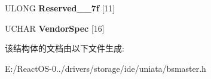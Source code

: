 \begin{DoxyCompactItemize}
\begin{tabbing}
\end{tabbing}\item 
\mbox{\label{struct___i_d_e___a_h_c_i___p_o_r_t___r_e_g_i_s_t_e_r_s_aa500b8d00198848ba6c14eba064be943}} 
U\+L\+O\+NG {\bfseries Reserved\+\_\+\_\+7f} \mbox{[}11\mbox{]}
\item 
\mbox{\label{struct___i_d_e___a_h_c_i___p_o_r_t___r_e_g_i_s_t_e_r_s_a189ae9ecd53dc2ac24c0aa7643625409}} 
U\+C\+H\+AR {\bfseries Vendor\+Spec} \mbox{[}16\mbox{]}
\end{DoxyCompactItemize}


该结构体的文档由以下文件生成\+:\begin{DoxyCompactItemize}
\item 
E\+:/\+React\+O\+S-\/0../drivers/storage/ide/uniata/bsmaster.\+h\end{DoxyCompactItemize}

